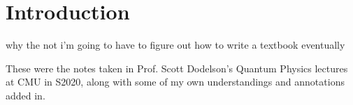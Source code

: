 \chapter*{Introduction}
why the not i'm going to have to figure out how to write a textbook eventually

These were the notes taken in Prof. Scott Dodelson's Quantum Physics lectures at CMU in S2020, along with some of my own understandings and annotations added in.